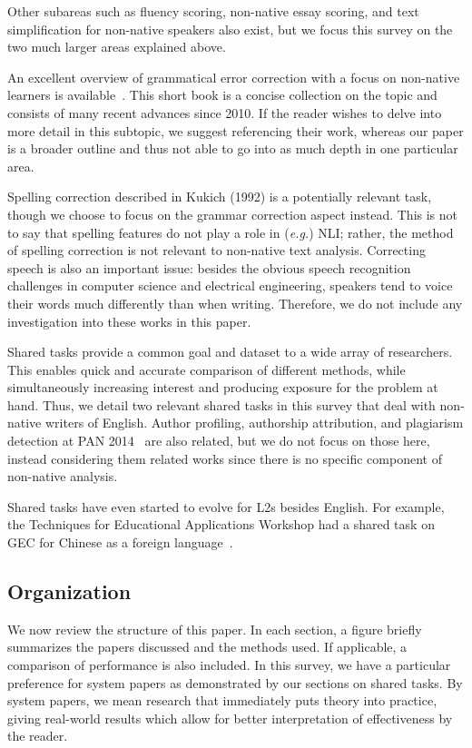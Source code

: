 Other subareas such as fluency scoring, non-native essay scoring, and text
simplification for non-native speakers also exist, but we focus this survey on
the two much larger areas explained above.

An excellent overview of grammatical error correction with a focus on non-native
learners is available~\cite{leacock-survey}. This short book is a concise
collection on the topic and consists of many recent advances since 2010. If the
reader wishes to delve into more detail in this subtopic, we suggest referencing
their work, whereas our paper is a broader outline and thus not able to go into
as much depth in one particular area.

Spelling correction described in Kukich (1992) is a potentially relevant
task, though we choose to focus on the grammar correction aspect instead. This
is not to say that spelling features do not play a role in (\emph{e.g.}) NLI;
rather, the method of spelling correction is not relevant to non-native text
analysis. Correcting speech is also an important issue: besides the obvious
speech recognition challenges in computer science and electrical engineering,
speakers tend to voice their words much differently than when writing.
Therefore, we do not include any investigation into these works in this paper.

Shared tasks provide a common goal and dataset to a wide array of researchers.
This enables quick and accurate comparison of different methods, while
simultaneously increasing interest and producing exposure for the problem at
hand. Thus, we detail two relevant shared tasks in this survey that deal with
non-native writers of English. Author profiling, authorship attribution, and
plagiarism detection at PAN 2014~\cite{pan-2014} are also related, but we do not
focus on those here, instead considering them related works since there is no
specific component of non-native analysis.

Shared tasks have even started to evolve for L2s besides English. For example,
the Techniques for Educational Applications Workshop had a shared task on GEC
for Chinese as a foreign language~\cite{tea}.

\subsection{Organization}

We now review the structure of this paper. In each section, a figure briefly
summarizes the papers discussed and the methods used. If applicable, a
comparison of performance is also included. In this survey, we have a particular
preference for system papers as demonstrated by our sections on shared tasks. By
system papers, we mean research that immediately puts theory into practice,
giving real-world results which allow for better interpretation of effectiveness
by the reader.

